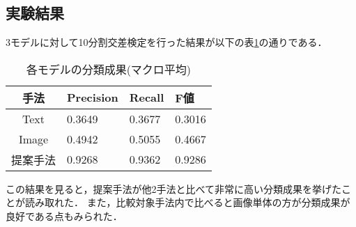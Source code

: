 \subsection{実験結果}
3モデルに対して10分割交差検定を行った結果が以下の表\ref{table:result}の通りである．
% 
\begin{table}[ht]
    \caption{各モデルの分類成果(マクロ平均)}
    \label{table:result}
    \centering
    \begin{tabular}{clll}
        \hline
        手法 & Precision & Recall & F値 \\
        \hline \hline
        Text & 0.3649 & 0.3677 & 0.3016 \\
        Image & 0.4942 & 0.5055 & 0.4667 \\
        提案手法 & 0.9268 & 0.9362 & 0.9286 \\
        \hline
    \end{tabular}
\end{table}

この結果を見ると，提案手法が他2手法と比べて非常に高い分類成果を挙げたことが読み取れた．
また，比較対象手法内で比べると画像単体の方が分類成果が良好である点もみられた．
